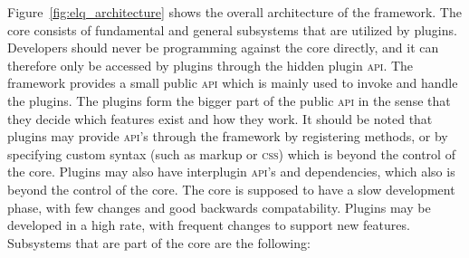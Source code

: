 \documentclass[a4paper,11pt]{kth-mag}
\begin{document}
        

        Figure~\ref{fig:elq_architecture} shows the overall architecture of the framework.
        The core consists of fundamental and general subsystems that are utilized by plugins.
        Developers should never be programming against the core directly, and it can therefore only be accessed by plugins through the hidden plugin \textsc{api}.
        The framework provides a small public \textsc{api} which is mainly used to invoke and handle the plugins.
        The plugins form the bigger part of the public \textsc{api} in the sense that they decide which features exist and how they work.
        It should be noted that plugins may provide \textsc{api}'s through the framework by registering methods, or by specifying custom syntax (such as markup or \textsc{css}) which is beyond the control of the core.
        Plugins may also have interplugin \textsc{api}'s and dependencies, which also is beyond the control of the core.
        The core is supposed to have a slow development phase, with few changes and good backwards compatability.
        Plugins may be developed in a high rate, with frequent changes to support new features.
        Subsystems that are part of the core are the following:
\end{document}
